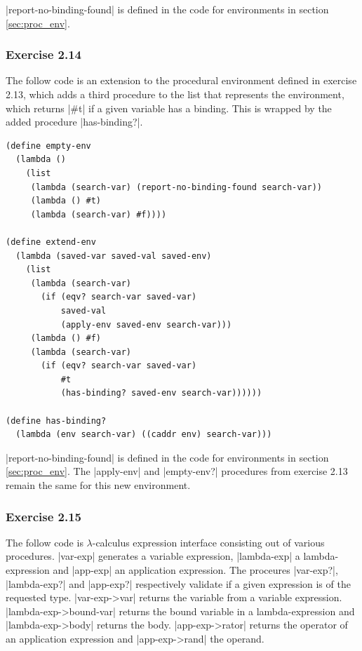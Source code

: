 \documentclass[a4paper]{article}
\begin{document}
|report-no-binding-found| is defined in the code for environments in section \ref{sec:proc_env}.

\subsubsection{Exercise 2.14}

The follow code is an extension to the procedural environment defined in exercise 2.13, which adds a third procedure to the list that represents the environment, which returns |#t| if a given variable has a binding. This is wrapped by the added procedure |has-binding?|.

\begin{lstlisting}
(define empty-env
  (lambda ()
    (list
     (lambda (search-var) (report-no-binding-found search-var))
     (lambda () #t)
     (lambda (search-var) #f))))

(define extend-env
  (lambda (saved-var saved-val saved-env)
    (list
     (lambda (search-var)
       (if (eqv? search-var saved-var)
           saved-val
           (apply-env saved-env search-var)))
     (lambda () #f)
     (lambda (search-var)
       (if (eqv? search-var saved-var)
           #t
           (has-binding? saved-env search-var))))))

(define has-binding?
  (lambda (env search-var) ((caddr env) search-var)))
\end{lstlisting}

|report-no-binding-found| is defined in the code for environments in section \ref{sec:proc_env}. The |apply-env| and |empty-env?| procedures from exercise 2.13 remain the same for this new environment.

\subsubsection{Exercise 2.15}

The follow code is $\lambda$-calculus expression interface consisting out of various procedures. |var-exp| generates a variable expression, |lambda-exp| a lambda-expression and |app-exp| an application expression. The proceures |var-exp?|, |lambda-exp?| and |app-exp?| respectively validate if a given expression is of the requested type. |var-exp->var| returns the variable from a variable expression. |lambda-exp->bound-var| returns the bound variable in a lambda-expression and |lambda-exp->body| returns the body. |app-exp->rator| returns the operator of an application expression and |app-exp->rand| the operand.
\end{document}
